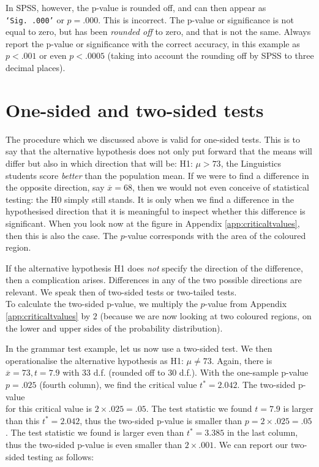 \documentclass[
]{book}
\begin{document}
In SPSS, however, the p-value is rounded off, and can then appear as
\texttt{‘Sig.\ .000’} or \(p=.000\). This is incorrect.
The p-value or significance is not equal to zero, but has
been \emph{rounded off} to zero, and that is not the same.
Always report the p-value or significance with the correct
accuracy, in this example as \(p<.001\) or even \(p<.0005\)
(taking into account the rounding off by SPSS to three decimal
places).

\hypertarget{sec:ttest-onesidedtwosided}{%
\section{One-sided and two-sided tests}\label{sec:ttest-onesidedtwosided}}

The procedure which we discussed above is valid for one-sided
tests. This is to say that the alternative hypothesis does not only put forward
that the means will differ but also in which direction that will be:
H1: \(\mu >73\), the Linguistics students score \emph{better} than the population
mean. If we were to find a difference in the opposite direction,
say \(\overline{x}=68\), then we would not even conceive of statistical testing:
the H0 simply still stands. It is only when we find a difference
in the hypothesised direction that it is meaningful to inspect whether
this difference is significant. When you look now at the figure in
Appendix \ref{app:criticaltvalues}, then this is also the case. The \(p\)-value
corresponds with the area of the coloured region.

If the alternative hypothesis H1 does \emph{not} specify the direction of the
difference, then a complication arises. Differences in any of the two possible directions
are relevant. We speak then of two-sided tests or two-tailed tests.\\
To calculate the two-sided p-value, we multiply the \(p\)-value from
Appendix \ref{app:criticaltvalues} by \(2\) (because we are now looking at two
coloured regions, on the lower and upper sides of the probability distribution).

In the grammar test example, let us now use a two-sided test. We
then operationalise the alternative hypothesis as H1: \(\mu \ne 73\).
Again, there is \(\overline{x}=73, t=7.9\) with 33 d.f. (rounded off to 30 d.f.).
With the one-sample p-value \(p=.025\) (fourth column), we find
the critical value \(t^*=2.042\). The two-sided p-value\\
for this critical value is \(2 \times .025 = .05\). The test statistic we found
\(t=7.9\) is larger than this \(t^*=2.042\), thus the two-sided
p-value is smaller than \(p=2\times.025=.05\). The test statistic we found
is larger even than \(t^*=3.385\) in the last column,
thus the two-sided p-value is even smaller than
\(2\times.001\). We can report our two-sided testing as
follows:
\end{document}
